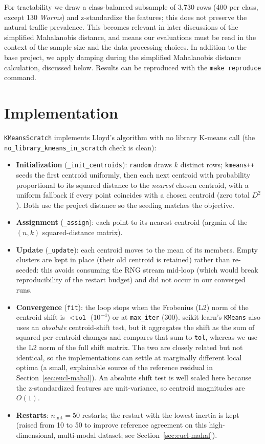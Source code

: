 For tractability we draw a class-balanced subsample of 3{,}730 rows (400 per
class, except 130 \textit{Worms}) and z-standardize the features; this does not
preserve the natural traffic prevalence. This becomes relevant in later
discussions of the
simplified Mahalanobis distance, and means our evaluations must be read in the
context of the sample size and the data-processing choices. In addition to the
base project, we apply damping during the simplified Mahalanobis distance
calculation, discussed below. Results can be reproduced with the
\texttt{make reproduce} command.

\section{Implementation}
\texttt{KMeansScratch} implements Lloyd's algorithm with no library K-means call
(the \texttt{no\_library\_kmeans\_in\_scratch} check is clean):
\begin{itemize}
  \item \textbf{Initialization} (\texttt{\_init\_centroids}): \texttt{random}
    draws $k$ distinct rows; \texttt{kmeans++} seeds the first centroid
    uniformly, then each next centroid with probability proportional to its
    squared distance to the \emph{nearest} chosen centroid, with a uniform
    fallback if every point coincides with a chosen centroid (zero total
    $D^2$). Both use the project distance so the seeding matches the objective.
  \item \textbf{Assignment} (\texttt{\_assign}): each point to its nearest
    centroid (argmin of the $(n,k)$ squared-distance matrix).
  \item \textbf{Update} (\texttt{\_update}): each centroid moves to the mean of
    its members. Empty clusters are kept in place (their old centroid is
    retained) rather than re-seeded: this avoids consuming the RNG stream
    mid-loop (which would break reproducibility of the restart budget) and did
    not occur in our converged runs.
  \item \textbf{Convergence} (\texttt{fit}): the loop stops when the Frobenius
    (L2) norm of the centroid shift is $< \texttt{tol}$ ($10^{-4}$) or at
    \texttt{max\_iter} (300). scikit-learn's \texttt{KMeans} also uses an
    \emph{absolute} centroid-shift test, but it aggregates the shift as the sum
    of squared per-centroid changes and compares that sum to \texttt{tol},
    whereas we use the L2 norm of the full shift matrix. The two are closely
    related but not identical, so the implementations can settle at marginally
    different local optima (a small, explainable source of the reference
    residual in Section~\ref{sec:eucl-mahal}). An absolute shift test is well
    scaled here because the z-standardized features are unit-variance, so
    centroid magnitudes are $O(1)$.
  \item \textbf{Restarts}: $n_{\mathrm{init}} = 50$ restarts; the restart with the
    lowest inertia is kept (raised from 10 to 50 to improve reference agreement
    on this high-dimensional, multi-modal dataset; see
    Section~\ref{sec:eucl-mahal}).
\end{itemize}
